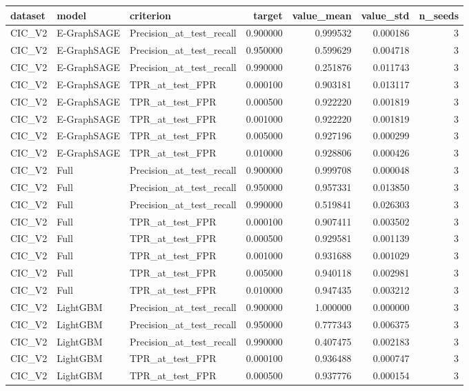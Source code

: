 \begin{tabular}{lllrrrr}
\toprule
dataset & model & criterion & target & value_mean & value_std & n_seeds \\
\midrule
CIC_V2 & E-GraphSAGE & Precision_at_test_recall & 0.900000 & 0.999532 & 0.000186 & 3 \\
CIC_V2 & E-GraphSAGE & Precision_at_test_recall & 0.950000 & 0.599629 & 0.004718 & 3 \\
CIC_V2 & E-GraphSAGE & Precision_at_test_recall & 0.990000 & 0.251876 & 0.011743 & 3 \\
CIC_V2 & E-GraphSAGE & TPR_at_test_FPR & 0.000100 & 0.903181 & 0.013117 & 3 \\
CIC_V2 & E-GraphSAGE & TPR_at_test_FPR & 0.000500 & 0.922220 & 0.001819 & 3 \\
CIC_V2 & E-GraphSAGE & TPR_at_test_FPR & 0.001000 & 0.922220 & 0.001819 & 3 \\
CIC_V2 & E-GraphSAGE & TPR_at_test_FPR & 0.005000 & 0.927196 & 0.000299 & 3 \\
CIC_V2 & E-GraphSAGE & TPR_at_test_FPR & 0.010000 & 0.928806 & 0.000426 & 3 \\
CIC_V2 & Full & Precision_at_test_recall & 0.900000 & 0.999708 & 0.000048 & 3 \\
CIC_V2 & Full & Precision_at_test_recall & 0.950000 & 0.957331 & 0.013850 & 3 \\
CIC_V2 & Full & Precision_at_test_recall & 0.990000 & 0.519841 & 0.026303 & 3 \\
CIC_V2 & Full & TPR_at_test_FPR & 0.000100 & 0.907411 & 0.003502 & 3 \\
CIC_V2 & Full & TPR_at_test_FPR & 0.000500 & 0.929581 & 0.001139 & 3 \\
CIC_V2 & Full & TPR_at_test_FPR & 0.001000 & 0.931688 & 0.001029 & 3 \\
CIC_V2 & Full & TPR_at_test_FPR & 0.005000 & 0.940118 & 0.002981 & 3 \\
CIC_V2 & Full & TPR_at_test_FPR & 0.010000 & 0.947435 & 0.003212 & 3 \\
CIC_V2 & LightGBM & Precision_at_test_recall & 0.900000 & 1.000000 & 0.000000 & 3 \\
CIC_V2 & LightGBM & Precision_at_test_recall & 0.950000 & 0.777343 & 0.006375 & 3 \\
CIC_V2 & LightGBM & Precision_at_test_recall & 0.990000 & 0.407475 & 0.002183 & 3 \\
CIC_V2 & LightGBM & TPR_at_test_FPR & 0.000100 & 0.936488 & 0.000747 & 3 \\
CIC_V2 & LightGBM & TPR_at_test_FPR & 0.000500 & 0.937776 & 0.000154 & 3 \\

\end{tabular}
